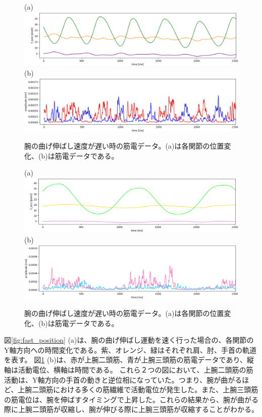\documentclass{jsarticle}
\begin{document}
\begin{figure}[!h]
	\begin{center}
		(a)
		\includegraphics[width=17cm]{graph_image/fast_position.png}
		\label{fig:fast_position}
		(b)
		\includegraphics[width=17cm]{graph_image/fast_EMG.png}
		\caption{腕の曲げ伸ばし速度が遅い時の筋電データ。(a)は各関節の位置変化、(b)は筋電データである。}
		\label{fig:fast_EMG}
	\end{center}
\end{figure}
\clearpage

\begin{figure}[!h]
	\begin{center}
		(a)
		\includegraphics[width=17cm]{graph_image/slow_position.png}
		\label{fig:slow_position}
		(b)
		\includegraphics[width=17cm]{graph_image/slow_EMG.png}
		\caption{腕の曲げ伸ばし速度が遅い時の筋電データ。(a)は各関節の位置変化、(b)は筋電データである。}
		\label{fig:slow_EMG}
	\end{center}
\end{figure}


図\ref{fig:fast_position} (a)は、腕の曲げ伸ばし運動を速く行った場合の、各関節のY軸方向への時間変化である。紫、オレンジ、緑はそれぞれ肩、肘、手首の軌道を表す。
図\ref{fig:fast_EMG} (b)は、赤が上腕二頭筋、青が上腕三頭筋の筋電データであり、縦軸は活動電位、横軸は時間である。
これら２つの図において、上腕二頭筋の筋活動は、Y軸方向の手首の動きと逆位相になっていた。つまり、腕が曲がるほど、上腕二頭筋における多くの筋繊維で活動電位が発生した。また、上腕三頭筋の筋電位は、腕を伸ばすタイミングで上昇した。これらの結果から、腕が曲がる際に上腕二頭筋が収縮し、腕が伸びる際に上腕三頭筋が収縮することがわかる。
\end{document}
